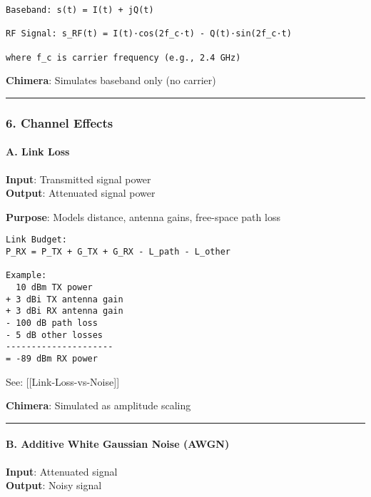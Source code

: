 \begin{verbatim}
Baseband: s(t) = I(t) + jQ(t)

RF Signal: s_RF(t) = I(t)·cos(2f_c·t) - Q(t)·sin(2f_c·t)

where f_c is carrier frequency (e.g., 2.4 GHz)
\end{verbatim}

\textbf{Chimera}: Simulates baseband only (no carrier)

\begin{center}\rule{0.5\linewidth}{0.5pt}\end{center}

\subsubsection{6. Channel Effects}\label{channel-effects}

\paragraph{A. Link Loss}\label{a.-link-loss}

\textbf{Input}: Transmitted signal power\\
\textbf{Output}: Attenuated signal power

\textbf{Purpose}: Models distance, antenna gains, free-space path loss

\begin{verbatim}
Link Budget:
P_RX = P_TX + G_TX + G_RX - L_path - L_other

Example:
  10 dBm TX power
+ 3 dBi TX antenna gain
+ 3 dBi RX antenna gain
- 100 dB path loss
- 5 dB other losses
---------------------
= -89 dBm RX power
\end{verbatim}

See: {[}{[}Link-Loss-vs-Noise{]}{]}

\textbf{Chimera}: Simulated as amplitude scaling

\begin{center}\rule{0.5\linewidth}{0.5pt}\end{center}

\paragraph{B. Additive White Gaussian Noise
(AWGN)}\label{b.-additive-white-gaussian-noise-awgn}

\textbf{Input}: Attenuated signal\\
\textbf{Output}: Noisy signal

